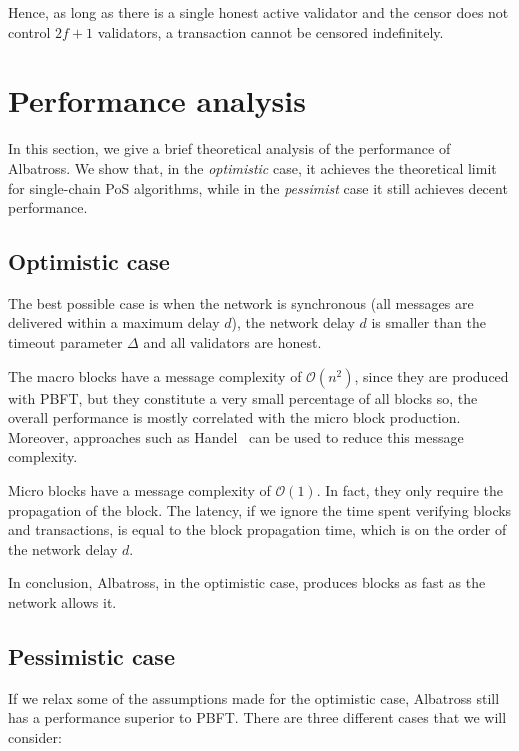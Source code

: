 \documentclass[conference]{IEEEtran}
\begin{document}
Hence, as long as there is a single honest active validator and the censor does not control $2f+1$ validators, a transaction cannot be censored indefinitely.

\section{Performance analysis}
In this section, we give a brief theoretical analysis of the performance of Albatross. We show that, in the \textit{optimistic} case, it achieves the theoretical limit for single-chain PoS algorithms, while in the \textit{pessimist} case it still achieves decent performance.

\subsection{Optimistic case}
The best possible case is when the network is synchronous (all messages are delivered within a maximum delay $d$), the network delay $d$ is smaller than the timeout parameter $\Delta$ and all validators are honest.

The macro blocks have a message complexity of $\mathcal{O}(n^2)$, since they are produced with PBFT, but they constitute a very small percentage of all blocks so, the overall performance is mostly correlated with the micro block production.
Moreover, approaches such as Handel~\cite{gailly2019handel} can be used to reduce this message complexity.

Micro blocks have a message complexity of $\mathcal{O}(1)$. In fact, they only require the propagation of the block. The latency, if we ignore the time spent verifying blocks and transactions, is equal to the block propagation time, which is on the order of the network delay $d$.

In conclusion, Albatross, in the optimistic case, produces blocks as fast as the network allows it.

\subsection{Pessimistic case}
If we relax some of the assumptions made for the optimistic case, Albatross still has a performance superior to PBFT. There are three different cases that we will consider:
\end{document}
